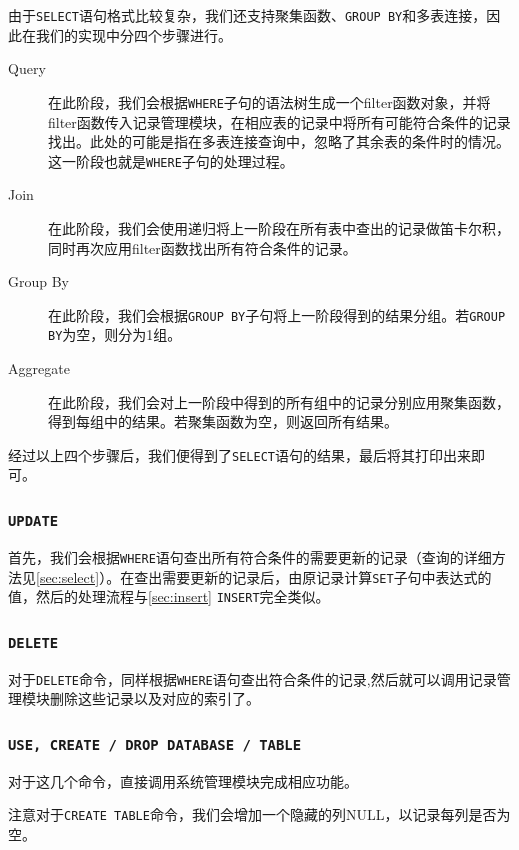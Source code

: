 \documentclass[11pt, a4paper]{article}
\begin{document}
由于\texttt{SELECT}语句格式比较复杂，我们还支持聚集函数、\texttt{GROUP BY}和多表连接，因此在我们的实现中分四个步骤进行。

\begin{description}
\item[Query] 在此阶段，我们会根据\texttt{WHERE}子句的语法树生成一个filter函数对象，并将filter函数传入记录管理模块，在相应表的记录中将所有可能符合条件的记录找出。此处的可能是指在多表连接查询中，忽略了其余表的条件时的情况。这一阶段也就是\texttt{WHERE}子句的处理过程。
\item[Join] 在此阶段，我们会使用递归将上一阶段在所有表中查出的记录做笛卡尔积，同时再次应用filter函数找出所有符合条件的记录。
\item[Group By] 在此阶段，我们会根据\texttt{GROUP BY}子句将上一阶段得到的结果分组。若\texttt{GROUP BY}为空，则分为1组。
\item[Aggregate] 在此阶段，我们会对上一阶段中得到的所有组中的记录分别应用聚集函数，得到每组中的结果。若聚集函数为空，则返回所有结果。
\end{description}

经过以上四个步骤后，我们便得到了\texttt{SELECT}语句的结果，最后将其打印出来即可。

\subsubsection{\texttt{UPDATE}}

首先，我们会根据\texttt{WHERE}语句查出所有符合条件的需要更新的记录（查询的详细方法见\ref{sec:select}）。在查出需要更新的记录后，由原记录计算\texttt{SET}子句中表达式的值，然后的处理流程与\ref{sec:insert} \texttt{INSERT}完全类似。

\subsubsection{\texttt{DELETE}}

对于\texttt{DELETE}命令，同样根据\texttt{WHERE}语句查出符合条件的记录,然后就可以调用记录管理模块删除这些记录以及对应的索引了。

\subsubsection{\texttt{USE, CREATE / DROP DATABASE / TABLE}}

对于这几个命令，直接调用系统管理模块完成相应功能。

注意对于\texttt{CREATE TABLE}命令，我们会增加一个隐藏的列NULL，以记录每列是否为空。
\end{document}

